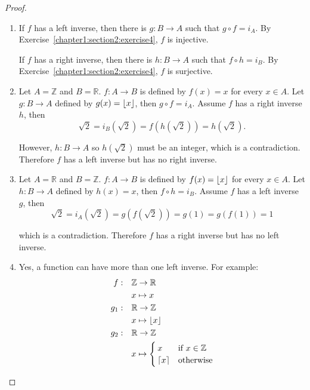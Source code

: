 \begin{proof}
    \begin{enumerate}[label={(\alph*)}]
        \item If $f$ has a left inverse, then there is $g: B\to A$ such that $g\circ f = i_{A}$. By Exercise~\ref{chapter1:section2:exercise4}, $f$ is injective.

              If $f$ has a right inverse, then there is $h: B\to A$ such that $f\circ h = i_{B}$. By Exercise~\ref{chapter1:section2:exercise4}, $f$ is surjective.
        \item Let $A = \mathbb{Z}$ and $B = \mathbb{R}$. $f: A\to B$ is defined by $f(x) = x$ for every $x\in A$. Let $g: B\to A$ defined by $g(x) = \left\lfloor{x}\right\rfloor$, then $g\circ f = i_{A}$. Assume $f$ has a right inverse $h$, then
              \[
                  \sqrt{2} = i_{B}(\sqrt{2}) = f(h(\sqrt{2})) = h(\sqrt{2}).
              \]

              However, $h: B\to A$ so $h(\sqrt{2})$ must be an integer, which is a contradiction. Therefore $f$ has a left inverse but has no right inverse.
        \item Let $A = \mathbb{R}$ and $B = \mathbb{Z}$. $f: A\to B$ is defined by $f(x) = \left\lfloor{x}\right\rfloor$ for every $x\in A$. Let $h: B\to A$ defined by $h(x) = x$, then $f\circ h = i_{B}$. Assume $f$ has a left inverse $g$, then
              \[
                  \sqrt{2} = i_{A}(\sqrt{2}) = g(f(\sqrt{2})) = g(1) = g(f(1)) = 1
              \]

              which is a contradiction. Therefore $f$ has a right inverse but has no left inverse.
        \item Yes, a function can have more than one left inverse. For example:
              \begin{align*}
                  f:     & \quad \mathbb{Z} \to \mathbb{R}                                    \\
                         & \quad x \mapsto x                                                  \\
                  g_{1}: & \quad\mathbb{R} \to \mathbb{Z}                                     \\
                         & \quad x\mapsto \left\lfloor{x}\right\rfloor                                           \\
                  g_{2}: & \quad\mathbb{R} \to \mathbb{Z}                                     \\
                         & \quad x \mapsto \begin{cases}
                                               x        & \text{if $x\in\mathbb{Z}$} \\
                                               \left\lceil{x}\right\rceil & \text{otherwise}
                                           \end{cases}
              \end{align*}


\end{enumerate}
\end{proof}
